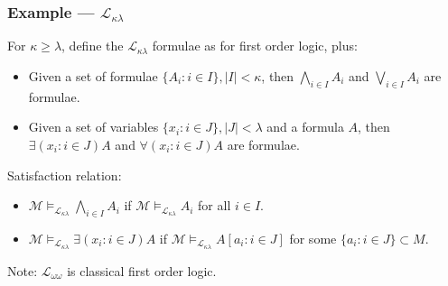 \documentclass[UTF8,11pt,colorlinks,compress,openany]{beamer}%
\begin{document}
\begin{frame}\frametitle{Example --- $\mathcal{L}_{\kappa\lambda}$}
	For $\kappa\geq\lambda$, define the $\mathcal{L}_{\kappa\lambda}$ formulae as for first order logic, plus:
	\begin{itemize}
		\item Given a set of formulae $\{A_i: i\in I\}, |I|<\kappa$, then $\bigwedge\limits_{i\in I} A_i$ and $\bigvee\limits_{i\in I} A_i$ are formulae.
		\item Given a set of variables $\{x_i: i\in J\}, |J|<\lambda$ and a formula $A$, then $\exists(x_i: i\in J) A$ and $\forall(x_i: i\in J) A$ are formulae.
	\end{itemize}
	Satisfaction relation:
	\begin{itemize}
		\item $\mathcal{M}\vDash_{\mathcal{L}_{\kappa\lambda}}\bigwedge\limits_{i\in I} A_i$ if $\mathcal{M}\vDash_{\mathcal{L}_{\kappa\lambda}} A_i$ for all $i\in I$.
		\item $\mathcal{M}\vDash_{\mathcal{L}_{\kappa\lambda}}\exists(x_i: i\in J) A$ if $\mathcal{M}\vDash_{\mathcal{L}_{\kappa\lambda}} A[a_i: i\in J]$ for some $\{a_i: i\in J\}\subset M$.
	\end{itemize}
	Note: $\mathcal{L}_{\omega\omega}$ is classical first order logic.
\end{frame}
\end{document}
